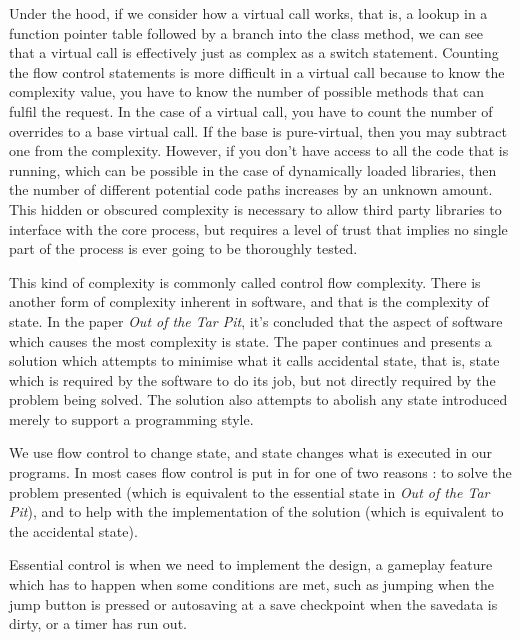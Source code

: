 \documentclass[a4paper,12pt]{book}
\begin{document}
Under the hood, if we consider how a virtual call works, that is, a lookup in a function pointer table followed by a branch into the class method, we can see that a virtual call is effectively just as complex as a switch statement.
Counting the flow control statements is more difficult in a virtual call because to know the complexity value, you have to know the number of possible methods that can fulfil the request.
In the case of a virtual call, you have to count the number of overrides to a base virtual call.
If the base is pure-virtual, then you may subtract one from the complexity.
However, if you don't have access to all the code that is running, which can be possible in the case of dynamically loaded libraries, then the number of different potential code paths increases by an unknown amount.
This hidden or obscured complexity is necessary to allow third party libraries to interface with the core process, but requires a level of trust that implies no single part of the process is ever going to be thoroughly tested.

This kind of complexity is commonly called control flow complexity.
There is another form of complexity inherent in software, and that is the complexity of state.
In the paper \textit{Out of the Tar Pit}, it's concluded that the aspect of software which causes the most complexity is state.
The paper continues and presents a solution which attempts to minimise what it calls accidental state, that is, state which is required by the software to do its job, but not directly required by the problem being solved.
The solution also attempts to abolish any state introduced merely to support a programming style.

We use flow control to change state, and state changes what is executed in our programs.
In most cases flow control is put in for one of two reasons :
to solve the problem presented (which is equivalent to the essential state in \textit{Out of the Tar Pit}), and to help with the implementation of the solution (which is equivalent to the accidental state).

Essential control is when we need to implement the design, a gameplay feature which has to happen when some conditions are met, such as jumping when the jump button is pressed or autosaving at a save checkpoint when the savedata is dirty, or a timer has run out.
\end{document}
